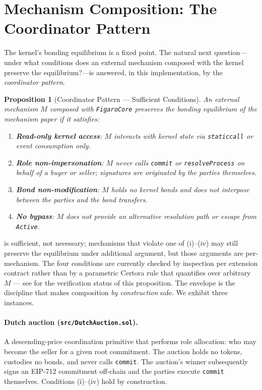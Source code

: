 \documentclass[11pt,a4paper]{article}
\newtheorem{proposition}[theorem]{Proposition}
\theoremstyle{definition}
\theoremstyle{remark}
\begin{document}
\section{Mechanism Composition: The Coordinator Pattern}
\label{sec:composition}

The kernel's bonding equilibrium is a fixed point. The natural next
question---under what conditions does an external mechanism composed
with the kernel preserve the equilibrium?---is answered, in this
implementation, by the \emph{coordinator pattern}.

\begin{proposition}[Coordinator Pattern --- Sufficient Conditions]
\label{prop:coordinator}
An external mechanism $M$ composed with \texttt{FigaroCore} preserves
the bonding equilibrium of the mechanism paper if it
satisfies:
\begin{enumerate}[label=(\roman*)]
  \item \textbf{Read-only kernel access}: $M$ interacts with kernel
    state via \texttt{staticcall} or event consumption only.
  \item \textbf{Role non-impersonation}: $M$ never calls
    \texttt{commit} or \texttt{resolveProcess} on behalf of a buyer
    or seller; signatures are originated by the parties themselves.
  \item \textbf{Bond non-modification}: $M$ holds no kernel bonds
    and does not interpose between the parties and the bond
    transfers.
  \item \textbf{No bypass}: $M$ does not provide an alternative
    resolution path or escape from \texttt{Active}.
\end{enumerate}
\end{proposition}

 is sufficient, not necessary; mechanisms
that violate one of (i)--(iv) may still preserve the equilibrium
under additional argument, but those arguments are per-mechanism.
The four conditions are currently checked by inspection per
extension contract rather than by a parametric Certora rule that
quantifies over arbitrary $M$ --- see  for the
verification status of this proposition. The envelope is the
discipline that makes composition \emph{by construction} safe.
We exhibit three instances.

\paragraph{Dutch auction (\texttt{src/DutchAuction.sol}).}
A descending-price coordination primitive that performs role
allocation: who may become the seller for a given root commitment.
The auction holds no tokens, custodies no bonds, and never calls
\texttt{commit}. The auction's winner subsequently signs an
EIP-712 commitment off-chain and the parties execute \texttt{commit}
themselves. Conditions (i)--(iv) hold by construction.
\end{document}

